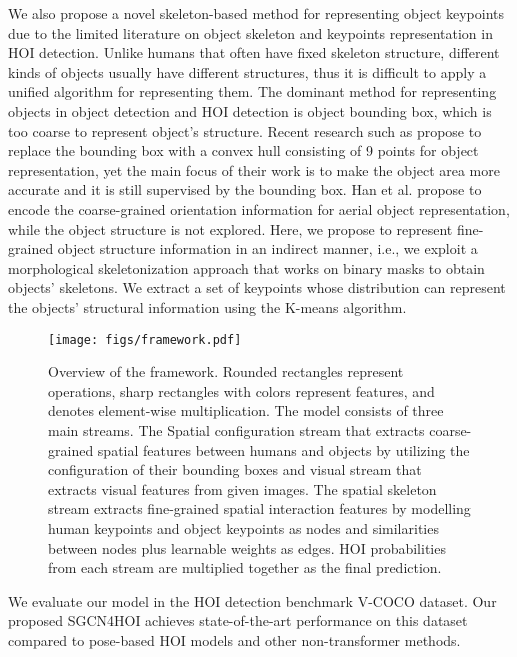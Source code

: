 \documentclass[a4paper, 10pt, conference]{IEEEtran}
\begin{document}
We also propose a novel skeleton-based method for representing object keypoints due to the limited literature on object skeleton and keypoints representation in HOI detection. Unlike humans that often have fixed skeleton structure, different kinds of objects usually have different structures, thus it is difficult to apply a unified algorithm for representing them. The dominant method for representing objects in object detection and HOI detection is object bounding box, which is too coarse to represent object's structure. Recent research such as \cite{CFA} propose to replace the bounding box with a convex hull consisting of 9 points for object representation, yet the main focus of their work is to make the object area more accurate and it is still supervised by the bounding box. Han et al. \cite{ReDet} propose to encode the coarse-grained orientation information for aerial object representation, while the object structure is not explored. Here, we propose to represent fine-grained object structure information in an indirect manner, i.e., we exploit a morphological skeletonization approach \cite{Zhang:skeleton84}  that works on binary masks to obtain objects' skeletons. We extract a set of keypoints whose distribution can represent the objects' structural information using the K-means algorithm. 

\begin{figure*}[htbp]
	\setlength{\abovecaptionskip}{5pt} 
	\centering
	\texttt{[image: figs/framework.pdf]}
	\caption{\footnotesize{Overview of the framework. Rounded rectangles represent operations, sharp rectangles with colors represent features, and  denotes element-wise multiplication. The model consists of three main streams. The Spatial configuration stream that extracts coarse-grained spatial features between humans and objects by utilizing the configuration of their bounding boxes and visual stream that extracts visual features from given images. The spatial skeleton stream extracts fine-grained spatial interaction features by modelling human keypoints and object keypoints as nodes and similarities between nodes plus learnable weights as edges. HOI probabilities from each stream are multiplied together as the final prediction.}}
	\label{Fig: framework}
\end{figure*}


We evaluate our model in the HOI detection benchmark V-COCO dataset. Our proposed SGCN4HOI achieves state-of-the-art performance on this dataset compared to pose-based HOI models and other non-transformer methods. 
\end{document}
